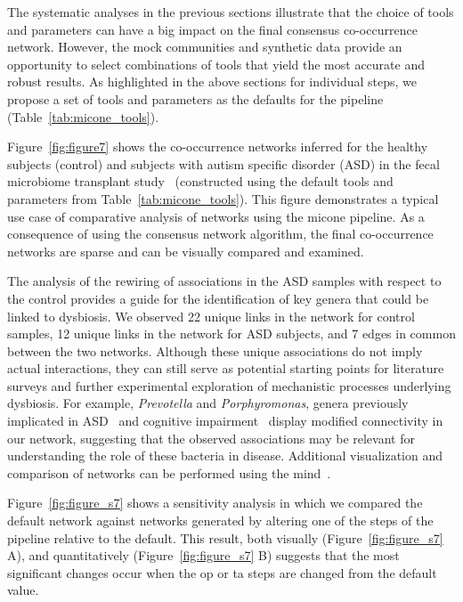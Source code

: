   The systematic analyses in the previous sections illustrate that the choice of tools and parameters can have a big impact on the final consensus co-occurrence network.
  However, the mock communities and synthetic data provide an opportunity to select combinations of tools that yield the most accurate and robust results.
  As highlighted in the above sections for individual steps, we propose a set of tools and parameters as the defaults for the pipeline (Table~\ref{tab:micone_tools}).

  Figure~\ref{fig:figure7} shows the co-occurrence networks inferred for the healthy subjects (control) and subjects with autism specific disorder (ASD) in the fecal microbiome transplant study~\cite{Kang2017} (constructed using the default tools and parameters from Table~\ref{tab:micone_tools}).
  This figure demonstrates a typical use case of comparative analysis of networks using the \ac{micone} pipeline.
  As a consequence of using the consensus network algorithm, the final co-occurrence networks are sparse and can be visually compared and examined.

  The analysis of the rewiring of associations in the ASD samples with respect to the control provides a guide for the identification of key genera that could be linked to dysbiosis.
  We observed 22 unique links in the network for control samples, 12 unique links in the network for ASD subjects, and 7 edges in common between the two networks.
  Although these unique associations do not imply actual interactions, they can still serve as potential starting points for literature surveys and further experimental exploration of mechanistic processes underlying dysbiosis.
  For example, \textit{Prevotella} and \textit{Porphyromonas}, genera previously implicated in ASD~\cite{Kang2017,hoGutMicrobiotaChanges2020} and cognitive impairment~\cite{chiPorphyromonasGingivalisInducedCognitive2021} display modified connectivity in our network, suggesting that the observed associations may be relevant for understanding the role of these bacteria in disease.
  Additional visualization and comparison of networks can be performed using the \acf{mind}~\cite{huResourceComparisonIntegration2022}.

  Figure~\ref{fig:figure_s7} shows a sensitivity analysis in which we compared the default network against networks generated by altering one of the steps of the pipeline relative to the default.
  This result, both visually (Figure~\ref{fig:figure_s7} A), and quantitatively (Figure~\ref{fig:figure_s7} B)  suggests that the most significant changes occur when the \ac{op} or \ac{ta} steps are changed from the default value.

